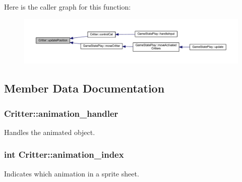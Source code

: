 Here is the caller graph for this function\+:
\nopagebreak
\begin{figure}[H]
\begin{center}
\leavevmode
\includegraphics[width=350pt]{class_critter_a96462bdb554e60ee1c3bb76d7cde3da6_icgraph}
\end{center}
\end{figure}




\subsection{Member Data Documentation}
\hypertarget{class_critter_a9792a56974224a81ca5ceec3eb967ad6}{
\subsubsection[{animation\+\_\+handler}]{ Critter\+::animation\+\_\+handler}}\label{class_critter_a9792a56974224a81ca5ceec3eb967ad6}


Handles the animated object. 

\hypertarget{class_critter_a00b1ddafe5beeed3dac75f81568bb404}{
\subsubsection[{animation\+\_\+index}]{\setlength{\rightskip}{0pt plus 5cm}int Critter\+::animation\+\_\+index\hspace{0.3cm}{\ttfamily [protected]}}}\label{class_critter_a00b1ddafe5beeed3dac75f81568bb404}


Indicates which animation in a sprite sheet. 

